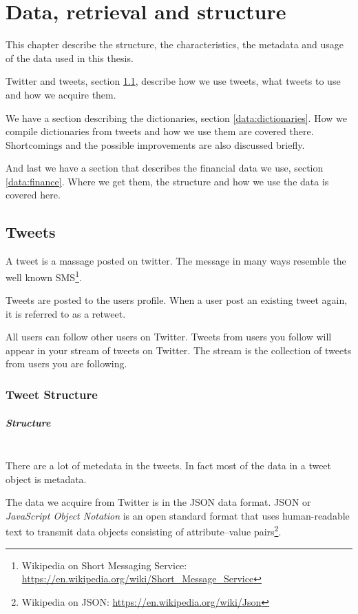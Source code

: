 \chapter{Data, retrieval and structure}\label{data}
This chapter describe the structure, the characteristics, the metadata and usage
of the data used in this thesis. 

Twitter and tweets, section \ref{data:tweets}, describe
how we use tweets, what tweets to use and how we acquire them.

We have a section describing the dictionaries, section \ref{data:dictionaries}.
How we compile dictionaries from tweets and how we use them are covered there.
Shortcomings and the possible improvements are also discussed briefly.   

And last we have a section that describes the financial data we use, section
\ref{data:finance}. Where we get them, the structure and how we use the data is
covered here. 
%

\section{Tweets}\label{data:tweets}
A tweet is a massage posted on twitter. The message in many ways resemble the
well known SMS\footnote{Wikipedia on Short Messaging
Service: \url{https://en.wikipedia.org/wiki/Short_Message_Service}}.

Tweets are posted to the users profile. When a user post an existing tweet
again, it is referred to as a retweet. 

All users can follow other users on Twitter. Tweets from users you follow will
appear in your stream of tweets on Twitter. The stream is the collection of
tweets from users you are following.  
%

\subsection{Tweet Structure}
\paragraph{Structure}
\hspace{0pt}\\
There are a lot of metedata in the tweets. In fact most of the data in a tweet
object is metadata. 

The data we acquire from Twitter is in the JSON data format. JSON or \textit{JavaScript
Object Notation} is an open standard format that uses human-readable text to
transmit data objects consisting of attribute–value
pairs\footnote{Wikipedia on JSON: \url{https://en.wikipedia.org/wiki/Json}}.

